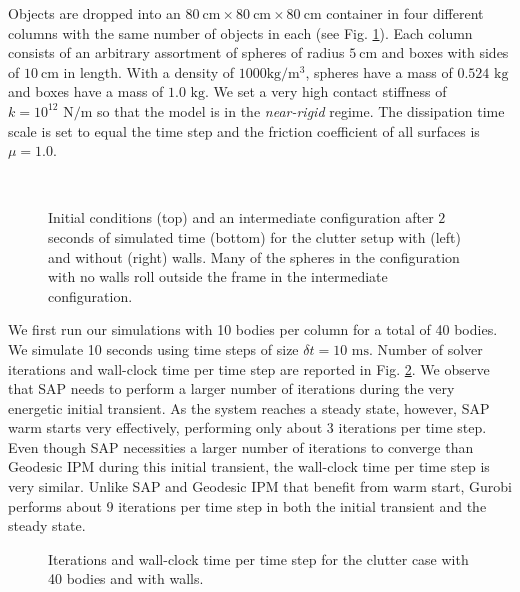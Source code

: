 Objects are dropped into an $80~\text{cm}\times80~\text{cm}\times80~\text{cm}$
container in four different columns with the same number of objects in each (see
Fig. \ref{fig:clutter_snapshots}). Each column consists of an arbitrary
assortment of spheres of radius $5~\text{cm}$ and boxes with sides of
$10~\text{cm}$ in length. With a density of $1000\text{kg}/\text{m}^3$, spheres
have a mass of $0.524\text{ kg}$ and boxes have a mass of $1.0\text{ kg}$. We
set a very high contact stiffness of $k=10^{12}\text{ N}/\text{m}$ so that the
model is in the \emph{near-rigid} regime. The dissipation time scale is set to
equal the time step and the friction coefficient of all surfaces is $\mu=1.0$.
\begin{figure}[t]
    \centering
    \\
    \vspace{0.1cm}
    \caption{Initial conditions (top) and an intermediate configuration after
    $2$ seconds of simulated time (bottom) for the clutter setup with (left) and
    without (right) walls. Many of the spheres in the configuration with no
    walls roll outside the frame in the intermediate configuration.}
    \label{fig:clutter_snapshots}
\end{figure}

We first run our simulations with 10 bodies per column for a total of 40 bodies.
We simulate 10 seconds using time steps of size $\delta t = 10\text{ ms}$.
Number of solver iterations and wall-clock time per time step are reported in
Fig. \ref{fig:clutter_w_walls_nb40}. We observe that SAP needs to perform a
larger number of iterations during the very energetic initial transient. As the
system reaches a steady state, however, SAP warm starts very effectively,
performing only about $3$ iterations per time step. Even though SAP necessities
a larger number of iterations to converge than Geodesic IPM during this initial
transient, the wall-clock time per time step is very similar. Unlike SAP and
Geodesic IPM that benefit from warm start, Gurobi performs about $9$
iterations per time step in both the initial transient and the steady state.
\begin{figure}[!h]
	\centering
	\caption{\label{fig:clutter_w_walls_nb40} 
	Iterations and wall-clock time per time step for the clutter case with 40
	bodies and with walls.}
\end{figure}

